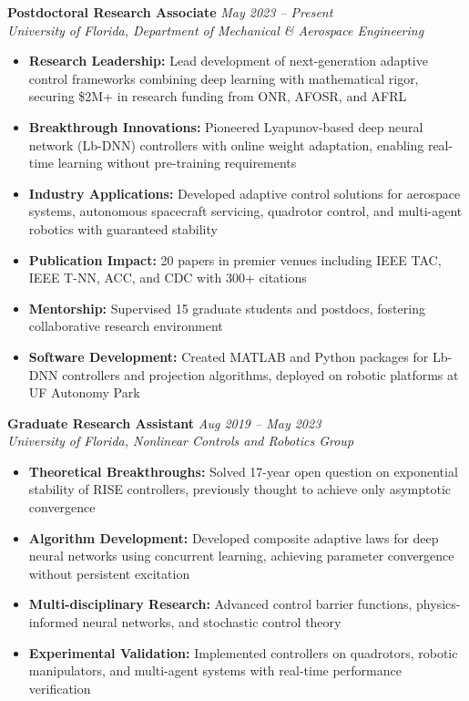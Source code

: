 \documentclass[10pt, letterpaper]{article}
\begin{document}
\textbf{Postdoctoral Research Associate} \hfill \textit{May 2023 -- Present}\\
\textit{University of Florida, Department of Mechanical \& Aerospace Engineering}
\begin{itemize}[leftmargin=20pt, itemsep=1pt]
    \item \textbf{Research Leadership:} Lead development of next-generation adaptive control frameworks combining deep learning with mathematical rigor, securing \$2M+ in research funding from ONR, AFOSR, and AFRL
    \item \textbf{Breakthrough Innovations:} Pioneered Lyapunov-based deep neural network (Lb-DNN) controllers with online weight adaptation, enabling real-time learning without pre-training requirements
    \item \textbf{Industry Applications:} Developed adaptive control solutions for aerospace systems, autonomous spacecraft servicing, quadrotor control, and multi-agent robotics with guaranteed stability
    \item \textbf{Publication Impact:} 20 papers in premier venues including IEEE TAC, IEEE T-NN, ACC, and CDC with 300+ citations
    \item \textbf{Mentorship:} Supervised 15 graduate students and postdocs, fostering collaborative research environment
    \item \textbf{Software Development:} Created MATLAB and Python packages for Lb-DNN controllers and projection algorithms, deployed on robotic platforms at UF Autonomy Park
\end{itemize}

\textbf{Graduate Research Assistant} \hfill \textit{Aug 2019 -- May 2023}\\
\textit{University of Florida, Nonlinear Controls and Robotics Group}
\begin{itemize}[leftmargin=20pt, itemsep=1pt]
    \item \textbf{Theoretical Breakthroughs:} Solved 17-year open question on exponential stability of RISE controllers, previously thought to achieve only asymptotic convergence
    \item \textbf{Algorithm Development:} Developed composite adaptive laws for deep neural networks using concurrent learning, achieving parameter convergence without persistent excitation
    \item \textbf{Multi-disciplinary Research:} Advanced control barrier functions, physics-informed neural networks, and stochastic control theory
    \item \textbf{Experimental Validation:} Implemented controllers on quadrotors, robotic manipulators, and multi-agent systems with real-time performance verification
\end{itemize}
\end{document}
